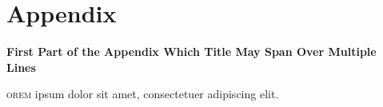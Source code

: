 
\appendix
\begin{appendices}
	\renewcommand*{\sectionmarkformat}{}	%
	\rohead{\leftmark}

	\label{sec:appendix.appendix}

	\section[First Part of the Appendix]{\fontsize{\customSecFontSize}{55}\selectfont Appendix }
		\vspace{\customSecPreDistAppdx}
		\begin{flushleft}
			{\fontsize{\customSecFontSizeAdd}{\customSecLineDistAdd}\selectfont\bfseries First Part of the Appendix Which\linebreak
			 Title May Span Over Multiple Lines\par}
		\end{flushleft}
		\vspace{\customSecPostDistAppdx}
		\label{sec:appendix.extended_discussion_SCD}

		\vspace{\dropCapSecVertDist}\lettrine{\color{\lettrineDropCapFontColor}{L}}{orem} ipsum dolor sit amet, consectetuer adipiscing elit. \blindtext[3]



\end{appendices}
